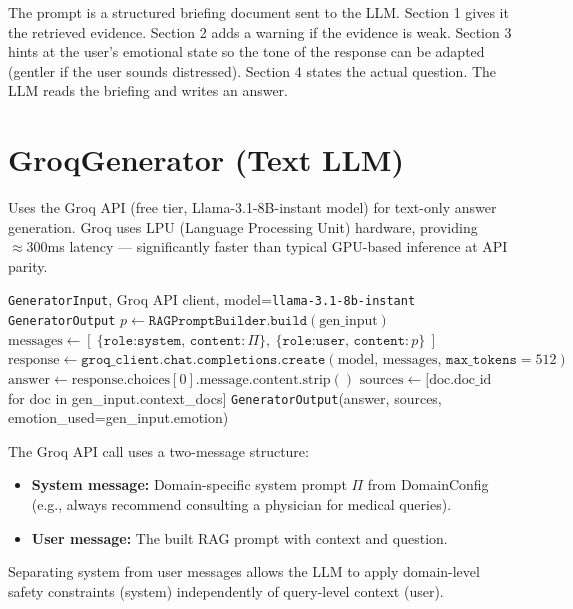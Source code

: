 \documentclass[12pt,a4paper]{article}
\theoremstyle{definition}
\theoremstyle{plain}
\theoremstyle{remark}
\newcommand{\layman}[1]{\begin{tcolorbox}[laymanstyle]#1\end{tcolorbox}}
\begin{document}
\layman{The prompt is a structured briefing document sent to the LLM. Section 1 gives it the retrieved evidence. Section 2 adds a warning if the evidence is weak. Section 3 hints at the user's emotional state so the tone of the response can be adapted (gentler if the user sounds distressed). Section 4 states the actual question. The LLM reads the briefing and writes an answer.}

\section{GroqGenerator (Text LLM)}

\begin{tcolorbox}[defstyle, title={Definition 5.1 — GroqGenerator}]
Uses the Groq API (free tier, Llama-3.1-8B-instant model) for text-only answer generation. Groq uses LPU (Language Processing Unit) hardware, providing $\approx 300$ms latency — significantly faster than typical GPU-based inference at API parity.
\end{tcolorbox}

\begin{algorithm}[H]
\caption{GroqGenerator.generate(gen\_input)}
\begin{algorithmic}[1]
\Require \texttt{GeneratorInput}, Groq API client, model=\texttt{llama-3.1-8b-instant}
\Ensure \texttt{GeneratorOutput}
\State $p \gets \texttt{RAGPromptBuilder.build}(\text{gen\_input})$
\State $\text{messages} \gets [\ \{\texttt{role:system, content:}\,\Pi\},\ \{\texttt{role:user, content:}\,p\}\ ]$
\State $\text{response} \gets \texttt{groq\_client.chat.completions.create}(\text{model},\, \text{messages},\, \texttt{max\_tokens}=512)$
\State $\text{answer} \gets \text{response.choices}[0].\text{message.content.strip}()$
\State $\text{sources} \gets [\text{doc.doc\_id}$ for doc in gen\_input.context\_docs$]$
\State \Return \texttt{GeneratorOutput}(answer, sources, emotion\_used=gen\_input.emotion)
\end{algorithmic}
\end{algorithm}

\begin{tcolorbox}[lemmastyle, title={Lemma 5.1 — Two-Message Architecture}]
The Groq API call uses a two-message structure:
\begin{itemize}[noitemsep]
  \item \textbf{System message:} Domain-specific system prompt $\Pi$ from DomainConfig (e.g., always recommend consulting a physician for medical queries).
  \item \textbf{User message:} The built RAG prompt with context and question.
\end{itemize}
Separating system from user messages allows the LLM to apply domain-level safety constraints (system) independently of query-level context (user).
\end{tcolorbox}
\end{document}
